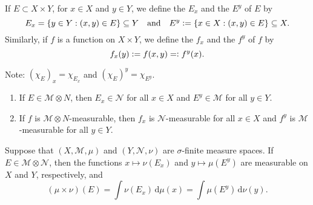 \documentclass[12pt]{article}	%
\begin{document}
If $E \subset X \times Y$, for $x \in X$ and $y \in Y$, we define the  $E_{x}$ and the  $E^{y}$ of $E$ by
\begin{equation*} 
	E_{x} = \{y \in Y : (x, y) \in E\} \subseteq Y \quad\text{and}\quad E^{y} \vcentcolon= \{x \in X : (x, y) \in E\} \subseteq X.
\end{equation*}
Similarly, if $f$ is a function on $X \times Y$, we define the  $f_{x}$ and the  $f^{y}$ of $f$ by
\begin{equation*} 
	f_{x}(y) \vcentcolon= f(x, y) =\vcentcolon f^{y}(x).
\end{equation*}

Note: $(\chi_{E})_{x} = \chi_{E_{x}}$ and $(\chi_{E})^{y} = \chi_{E^{y}}$.

\begin{prop}
	\phantom{hi}
	\begin{enumerate}
		\item If $E \in \mathcal{M} \otimes N$, then $E_{x} \in \mathcal{N}$ for all $x \in X$ and $E^{y} \in \mathcal{M}$ for all $y \in Y$.
		\item If $f$ is $\mathcal{M} \otimes N$-measurable, then $f_{x}$ is $\mathcal{N}$-measurable for all $x \in X$ and $f^{y}$ is $\mathcal{M}$-measurable for all $y \in Y$.
	\end{enumerate}
\end{prop}

\begin{thm}
	Suppose that $(X, \mathcal{M}, \mu)$ and $(Y, \mathcal{N}, \nu)$ are $\sigma$-finite measure spaces. If $E \in \mathcal{M} \otimes \mathcal{N}$, then the functions $x \mapsto \nu(E_{x})$ and $y \mapsto \mu(E^{y})$ are measurable on $X$ and $Y$, respectively, and
	\begin{equation*} 
		(\mu \times \nu)(E) = \int \nu(E_{x}) \,{\mathrm d}\mu(x) = \int \mu(E^{y}) \,{\mathrm d}\nu(y).
	\end{equation*}
\end{thm}
\end{document}
